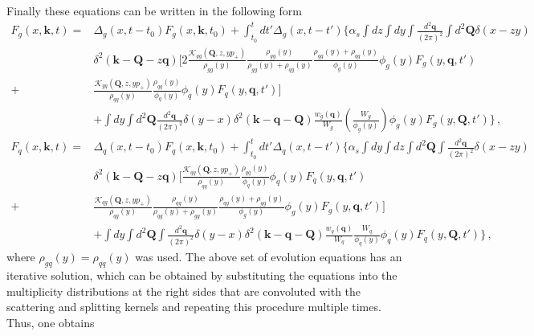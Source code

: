 \documentclass[preprint,12pt]{elsarticle}
\begin{document}
%
Finally these equations can be written in the following form
%
\begin{align}
    F_g(x,\mathbf{k},t)=&\Delta_g(x,t-t_0)F_g(x,\mathbf{k},t_0)+\int_{t_0}^t dt' \Delta_g(x,t-t')\bigg\{ \alpha_s\int dz \int dy \int \frac{d^2 \mathbf{q}}{(2\pi)^2}\int d^2\mathbf{Q} \delta(x-zy)        \nonumber\\
    &\delta^2(\mathbf{k}-\mathbf{Q}-z\mathbf{q})
\bigg[2\frac{\mathcal{K}_{gg}(\mathbf{Q},z,yp_+)}{\rho_{gg}(y)}\frac{\rho_{gg}(y)}{\rho_{gg}(y)+\rho_{qg}(y)}\frac{\rho_{gg}(y)+\rho_{qg}(y)}{\phi_g(y)}\phi_g(y)F_g(y,\mathbf{q},t')
    \nonumber\\
+&\frac{\mathcal{K}_{gq}(\mathbf{Q},z,yp_+)}{\rho_{qq}(y)}\frac{\rho_{qq}(y)}{\phi_q(y)}\phi_q(y)F_q(y,\mathbf{q},t')\bigg]
    \nonumber\\
    &+\int dy \int d^2\mathbf{Q}  \frac{d^2\mathbf{q}}{(2\pi)^2} \delta(y-x) \delta^2(\mathbf{k}-\mathbf{q}-\mathbf{Q})\frac{w_g(\mathbf{q})}{W_g}  
    \left( \frac{W_g}{\phi_g(y)}\right)\phi_g(y)
    F_g(y,\mathbf{Q},t')\bigg\}\,,
    \label{eq:bdim_int_g3}
    \\
    F_q(x,\mathbf{k},t)=&\Delta_q(x,t-t_0)F_q(x,\mathbf{k},t_0)+\int_{t_0}^t dt' \Delta_q(x,t-t')\bigg\{ \alpha_s\int dy \int dz\int d^2\mathbf{Q}\int \frac{d^2 \mathbf{q}}{(2\pi)^2} \delta(x-zy)        \nonumber\\
    &\delta^2(\mathbf{k}-\mathbf{Q}-z\mathbf{q})
\bigg[\frac{\mathcal{K}_{qq}(\mathbf{Q},z,yp_+)}{\rho_{qq}(y)}\frac{\rho_{qq}(y)}{\phi_q(y)}\phi_q(y)F_q(y,\mathbf{q},t')
    \nonumber\\
+&\frac{\mathcal{K}_{qg}(\mathbf{Q},z,yp_+)}{\rho_{qg}(y)}\frac{\rho_{qg}(y)}{\rho_{qg}(y)+\rho_{gg}(y)}\frac{\rho_{qg}(y)+\rho_{gg}(y)}{\phi_g(y)}\phi_g(y)F_g(y,\mathbf{q},t')\bigg]
    \nonumber\\
    &+\int dy \int d^2\mathbf{Q} \int  \frac{d^2\mathbf{q}}{(2\pi)^2} \delta(y-x) \delta^2(\mathbf{k}-\mathbf{q}-\mathbf{Q}) \frac{w_q(\mathbf{q})}{W_q}  
    \frac{W_q}{\phi_q(y)}\phi_q(y)F_q(y,\mathbf{Q},t')\bigg\}\,,
    \label{eq:bdim_int_q3}
\end{align}
%
where $\rho_{gq}(y)=\rho_{qq}(y)$ was used.
The above set of evolution equations has an iterative solution, which can be obtained by substituting the equations  into the multiplicity distributions  at the right sides that are convoluted with the scattering and splitting kernels and repeating this procedure multiple times. 
Thus, one obtains
%
\end{document}
